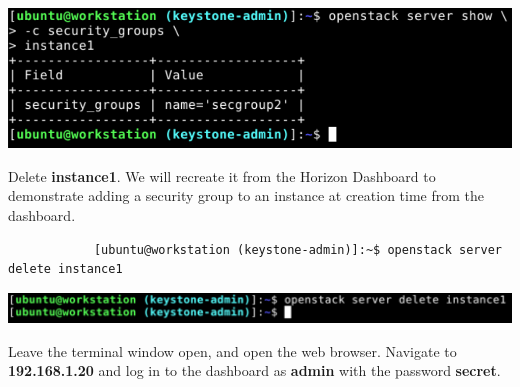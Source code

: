 \documentclass[letterpaper, 12pt]{article}
\begin{document}
\begin{enumerate}
\begin{labstep}
        \begin{center}
            \includegraphics[width=\linewidth]{images/part2/step7.png}
        \end{center}
    \end{labstep}

    \begin{labstep}
        Delete \textbf{instance1}.
        We will recreate it from the Horizon Dashboard to demonstrate adding a security group to an instance at creation time from the dashboard.
        \begin{lstlisting}
            [ubuntu@workstation (keystone-admin)]:~$ openstack server delete instance1
        \end{lstlisting}

        \begin{center}
            \includegraphics[width=\linewidth]{images/part2/step8.png}
        \end{center}
    \end{labstep}

    \begin{labstep}
        Leave the terminal window open, and open the web browser.
        Navigate to \textbf{192.168.1.20} and log in to the dashboard as \textbf{admin} with the password \textbf{secret}.


\end{labstep}
\end{enumerate}
\end{document}
